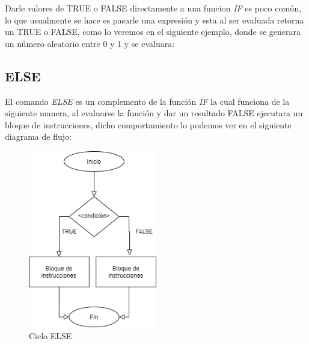 \documentclass[11pt,]{article}
\newenvironment{Shaded}{\begin{snugshade}}{\end{snugshade}}
\newcommand{\ControlFlowTok}[1]{\textcolor[rgb]{0.13,0.29,0.53}{\textbf{#1}}}
\newcommand{\DecValTok}[1]{\textcolor[rgb]{0.00,0.00,0.81}{#1}}
\newcommand{\FloatTok}[1]{\textcolor[rgb]{0.00,0.00,0.81}{#1}}
\newcommand{\KeywordTok}[1]{\textcolor[rgb]{0.13,0.29,0.53}{\textbf{#1}}}
\newcommand{\NormalTok}[1]{#1}
\newcommand{\OperatorTok}[1]{\textcolor[rgb]{0.81,0.36,0.00}{\textbf{#1}}}
\newcommand{\StringTok}[1]{\textcolor[rgb]{0.31,0.60,0.02}{#1}}
\begin{document}
Darle valores de TRUE o FALSE directamente a una funcion \emph{IF} es
poco común, lo que usualmente se hace es pasarle una expresión y esta al
ser evaluada retorna un TRUE o FALSE, como lo veremos en el siguiente
ejemplo, donde se generara un número aleatorio entre 0 y 1 y se
evaluara:

\begin{Shaded}
\end{Shaded}

\hypertarget{else}{%
\subsection{ELSE}\label{else}}

El comando \emph{ELSE} es un complemento de la función \emph{IF} la cual
funciona de la siguiente manera, al evaluarse la función y dar un
resultado FALSE ejecutara un bloque de instrucciones, dicho
comportamiento lo podemos ver en el siguiente diagrama de flujo:

\begin{figure}
\hypertarget{id}{%
\centering
\includegraphics[width=0.5\textwidth,height=0.3\textheight]{../schemas/ELSE.png}
\caption{Ciclo ELSE}\label{id}
}
\end{figure}
\end{document}
